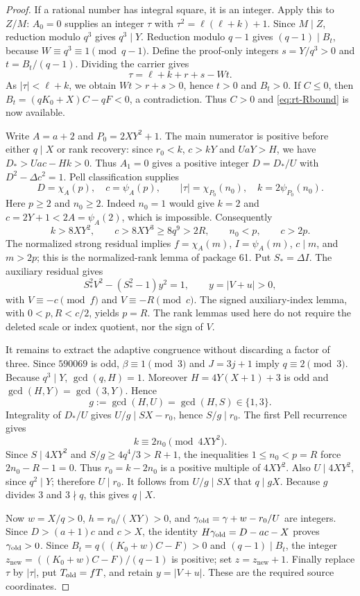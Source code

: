 \begin{proof}
If a rational number has integral square, it is an integer.  Apply this
to $Z/M$: $A_0=0$ supplies an integer $\tau$ with
$\tau^2=\ell(\ell+k)+1$.  Since $M\mid Z$, reduction modulo $q^3$
gives $q^3\mid Y$.  Reduction modulo $q-1$ gives $(q-1)\mid B_t$,
because $W\equiv q^3\equiv1\pmod{q-1}$.  Define the proof-only integers
$s=Y/q^3>0$ and $t=B_t/(q-1)$.  Dividing the carrier gives
\[
 \tau=\ell+k+r+s-Wt.
\]
As $|\tau|<\ell+k$, we obtain $Wt>r+s>0$, hence $t>0$ and $B_t>0$.
If $C\le0$, then $B_t=(qK_0+X)C-qF<0$, a contradiction.  Thus $C>0$
and \eqref{eq:rt-Rbound} is now available.

Write $A=a+2$ and $P_0=2XY^2+1$.  The main numerator is positive before
either $q\mid X$ or rank recovery: since $r_0<k$, $c>kY$ and
$UaY>H$, we have $D_*>Uac-Hk>0$.  Thus $A_1=0$ gives a positive integer
$D=D_*/U$ with $D^2-\Delta c^2=1$.
Pell classification supplies
\[
 D=\chi_A(p),\quad c=\psi_A(p),\qquad
 |\tau|=\chi_{P_0}(n_0),\quad k=2\psi_{P_0}(n_0).
\]
Here $p\ge2$ and $n_0\ge2$.  Indeed $n_0=1$ would give $k=2$ and
$c=2Y+1<2A=\psi_A(2)$, which is impossible.  Consequently
\[
 k>8XY^2,\qquad c>8XY^3\ge8q^9>2R,\qquad n_0<p,\qquad c>2p.
\]
The normalized strong residual implies $f=\chi_A(m)$,
$I=\psi_A(m)$, $c\mid m$, and $m>2p$; this is the normalized-rank
lemma of package 61.  Put $S_*=\Delta I$.  The auxiliary residual gives
\[
 S_*^2V^2-(S_*^2-1)y^2=1,\qquad y=|V+u|>0,
\]
with $V\equiv-c\pmod f$ and $V\equiv-R\pmod c$.
The signed auxiliary-index lemma, with $0<p,R<c/2$, yields $p=R$.
The rank lemmas used here do not require the deleted scale or index
quotient, nor the sign of $V$.

It remains to extract the adaptive congruence without discarding a factor
of three.  Since $590069$ is odd, $\beta\equiv1\pmod3$ and
$J=3j+1$ imply $q\equiv2\pmod3$.  Because $q^3\mid Y$,
$\gcd(q,H)=1$.  Moreover $H=4Y(X+1)+3$ is odd and
$\gcd(H,Y)=\gcd(3,Y)$.  Hence
\[
 g:=\gcd(H,U)=\gcd(H,S)\in\{1,3\}.
\]
Integrality of $D_*/U$ gives $U/g\mid SX-r_0$, hence $S/g\mid r_0$.
The first Pell recurrence gives
\[
 k\equiv2n_0\pmod{4XY^2}.
\]
Since $S\mid4XY^2$ and $S/g\ge4q^4/3>R+1$,
the inequalities $1\le n_0<p=R$ force
$2n_0-R-1=0$.  Thus $r_0=k-2n_0$ is a positive multiple of $4XY^2$.
Also $U\mid4XY^2$, since $q^2\mid Y$; therefore $U\mid r_0$.
It follows from $U/g\mid SX$ that $q\mid gX$.
Because $g$ divides $3$ and $3\nmid q$, this gives $q\mid X$.

Now $w=X/q>0$, $h=r_0/(XY)>0$, and
$\gamma_{\rm old}=\gamma+w-r_0/U$ are integers.  Since
$D>(a+1)c$ and $c>X$, the identity
$H\gamma_{\rm old}=D-ac-X$ proves $\gamma_{\rm old}>0$.
Since $B_t=q((K_0+w)C-F)>0$ and $(q-1)\mid B_t$, the integer
$z_{\mathrm{new}}=((K_0+w)C-F)/(q-1)$ is positive; set $z=z_{\mathrm{new}}+1$.
Finally replace $\tau$ by $|\tau|$, put $T_{\rm old}=fT$, and retain
$y=|V+u|$.  These are the required source coordinates.


\end{proof}
